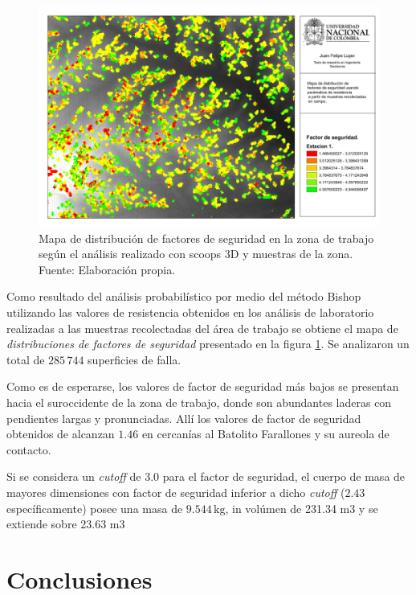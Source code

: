 \begin{figure}[H]
\centering
\includegraphics[scale=0.3]{img/fos3DCampo.pdf}
\caption{Mapa de distribuci\'on de factores de seguridad en la zona de trabajo seg\'un el an\'alisis realizado con scoops 3D y muestras de la zona. Fuente: Elaboraci\'on propia.}
\label{fig:fos3dout}
\end{figure}

Como resultado del an\'alisis probabil\'istico por medio del m\'etodo Bishop utilizando las valores de resistencia obtenidos en los an\'alisis de laboratorio realizadas a las muestras recolectadas del \'area de trabajo se obtiene el mapa de \emph{distribuciones de factores de seguridad} presentado en la figura \ref{fig:fos3dout}.
Se analizaron un total de \(285\,744\) superficies de falla.

Como es de esperarse, los valores de factor de seguridad m\'as bajos se presentan hacia el suroccidente de la zona de trabajo, donde  son abundantes laderas con pendientes  largas y pronunciadas. All\'i los valores de factor de seguridad obtenidos de alcanzan \(1.46\) en cercan\'ias al Batolito Farallones y su aureola de contacto. 

Si se considera un \textit{cutoff} de 3.0 para el factor de seguridad, el cuerpo de masa de mayores dimensiones con factor de seguridad  inferior a dicho \textit{cutoff} ($2.43$ espec\'ificamente) posee una masa de $9.544\,\text{kg}$, in vol\'umen de 231.34 m3 y se extiende sobre 23.63 m3



\section{Conclusiones}


